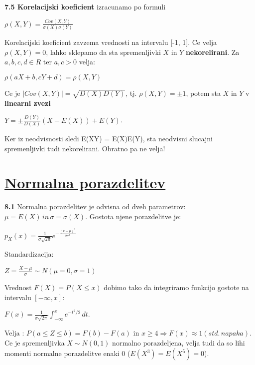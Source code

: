 \documentclass{article}
\begin{document}
\begin{multicols}{2}
\textbf{7.5 Korelacijski koeficient} izracunamo po formuli
\begin{center}
    \begin{math}
        \rho(X,Y) = \frac{Cov(X,Y)}
                      {\sigma(X) \sigma(Y)}
    \end{math}
\end{center}
Korelacijski koeficient zavzema vrednosti na intervalu [-1, 1].
Ce velja $\rho(X, Y) = 0$, lahko sklepamo da sta spremenljivki $X$ in $Y$ \textbf{nekorelirani}.
Za $a, b, c, d \in R$ ter $a, c > 0$ velja:
\begin{center}
    $\rho(aX + b, cY + d) = \rho(X, Y)$
\end{center}
Ce je $|Cov(X, Y)| = \sqrt{D(X)D(Y)}$, tj. $\rho(X, Y) = \pm 1$, potem sta $X$ in $Y$ v \textbf{linearni zvezi}
\begin{center}
    \begin{math}
        Y = \pm \frac{D(Y)}{D(X)}(X - E(X)) + E(Y)
    \end{math}.
\end{center}
Ker iz neodvisnosti sledi E(XY) = E(X)E(Y), sta neodvisni slucajni spremenljivki tudi nekorelirani. Obratno
pa ne velja!

\section{\underline{Normalna porazdelitev}}

\textbf{8.1} Normalna porazdelitev je odvisna od dveh parametrov:
$\mu = E(X)\, in\, \sigma = \sigma(X)$. Gostota njene porazdelitve je:
\begin{center}
    \begin{math}
        p_{X}(x) = \frac{1}{\sigma \sqrt{2 \pi}} e^{- \frac{(x - \mu)^{2}}{2 \sigma^{2}}}
    \end{math}        
\end{center}
Standardizacija: 
\begin{center}
    \begin{math}
        Z = \frac{X - \mu}{\sigma} \sim N(\mu =  0, \sigma = 1)
    \end{math}
\end{center}
Vrednost $F(X) = P(X \leq x)$ dobimo tako da integriramo
funkcijo gostote na intervalu $[-\infty, x]$:
\begin{center}
    \begin{math}
        F(x) = \frac{1}{\sigma \sqrt{2 \pi}} \int_{-\infty}^x e^{-t^2 / 2}\, dt
    \end{math}.
\end{center}
Velja : $P (a \leq Z \leq b) = F(b) - F(a)$ in $x \geq 4 \Rightarrow F(x) \approx 1 (std.\, napaka)$.\\
Ce je spremenljivka $X \sim N(0,1)$ normalno porazdeljena, velja tudi da so lihi momenti normalne porazdelitve enaki 0 ($E(X^3) = E(X^5) = 0$).


\end{multicols}
\end{document}
